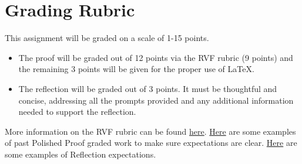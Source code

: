 \documentclass{article}
\theoremstyle{definition}
\begin{document}
\section*{Grading Rubric}
    This assignment will be graded on a scale of 1-15 points.
    \begin{itemize}
    \item The proof will be graded out of 12 points via the RVF rubric (9 points) and the remaining 3 points will be given for the proper use of \LaTeX.
    \item The reflection will be graded out of 3 points. It must be thoughtful and concise, addressing all the prompts provided and any additional information needed to support the reflection.
    \end{itemize}
     
    More information on the RVF rubric can be found 
    \href{https://drive.google.com/file/d/1P0OBjw-GkX64uCpYcqYmXARapf9MwaiI/view?usp=sharing}{here}. 
    \href{https://drive.google.com/file/d/14zLx8TDPdD8shbwgMGPAAWdQrUZDz1jd/view?usp=share_link}{Here} 
    are some examples of past Polished Proof graded work to make sure expectations are clear. \href{https://docs.google.com/document/d/1GcCZI_ueOWXlBC9xIBietOw1uEzFIyg-TzuHvbCZumU/edit?usp=sharing}{Here} are some examples of Reflection expectations.

	
\end{document}
